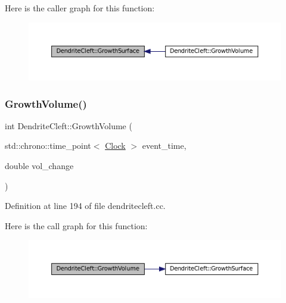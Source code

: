 Here is the caller graph for this function\+:\nopagebreak
\begin{figure}[H]
\begin{center}
\leavevmode
\includegraphics[width=350pt]{class_dendrite_cleft_af4715ffbf1bf437523d07e37b7abc3e0_icgraph}
\end{center}
\end{figure}
\mbox{\label{class_dendrite_cleft_a0cb2fc6ad72bba55b5f65130006d4b12}} 
\subsubsection{\texorpdfstring{Growth\+Volume()}{GrowthVolume()}}
{\footnotesize\ttfamily int Dendrite\+Cleft\+::\+Growth\+Volume (\begin{DoxyParamCaption}\item[{std\+::chrono\+::time\+\_\+point$<$ \mbox{\hyperlink{universe_8h_a0ef8d951d1ca5ab3cfaf7ab4c7a6fd80}{Clock}} $>$}]{event\+\_\+time,  }\item[{double}]{vol\+\_\+change }\end{DoxyParamCaption})}



Definition at line 194 of file dendritecleft.\+cc.

Here is the call graph for this function\+:\nopagebreak
\begin{figure}[H]
\begin{center}
\leavevmode
\includegraphics[width=350pt]{class_dendrite_cleft_a0cb2fc6ad72bba55b5f65130006d4b12_cgraph}
\end{center}
\end{figure}
\mbox{\label{class_dendrite_cleft_afaf06d4516355dfe2e0e4c33a00f0f1d}} 
